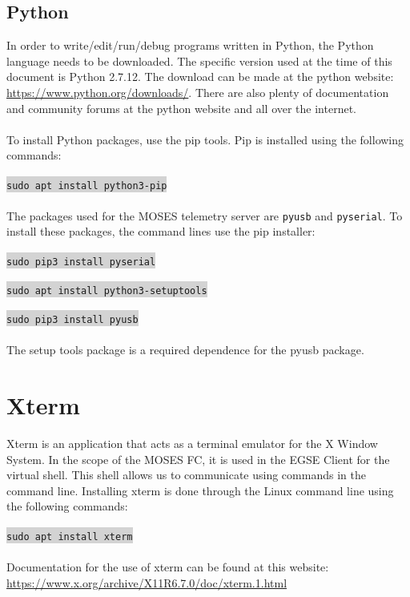 \documentclass[11pt,a4paper,titlepage]{article}
\begin{document}
	 \subsection{Python}
	 In order to write/edit/run/debug programs written in Python, the Python language needs to be downloaded. The specific version used at the time of this document is Python 2.7.12. The download can be made at the python website: \url{https://www.python.org/downloads/}. There are also plenty of documentation and community forums at the python website and all over the internet. \\
	 \\
	 To install Python packages, use the pip tools. Pip is installed using the following commands: \\
	 \\
	 \colorbox{lightgray}{\texttt{sudo apt install python3-pip}} \\
	 \\
	 
	 The packages used for the MOSES telemetry server are \texttt{pyusb} and \texttt{pyserial}. To install these packages, the command lines use the pip installer: \\
	 \\
	 \colorbox{lightgray}{\texttt{sudo pip3 install pyserial}} \\
	 \\
	 \colorbox{lightgray}{\texttt{sudo apt install python3-setuptools}} \\
	 \\
	 \colorbox{lightgray}{\texttt{sudo pip3 install pyusb}}\\
	 \\
	 The setup tools package is a required dependence for the pyusb package. 
	 
	 \section{Xterm}
	 Xterm is an application that acts as a terminal emulator for the X Window System. In the scope of the MOSES FC, it is used in the EGSE Client for the virtual shell. This shell allows us to communicate using commands in the command line. Installing xterm is done through the Linux command line using the following commands: \\
	 \\
	 \colorbox{lightgray}{\texttt{sudo apt install xterm}} \\
	 \\
	 Documentation for the use of xterm can be found at this website: \url{https://www.x.org/archive/X11R6.7.0/doc/xterm.1.html}
	 
	 
	
	 
	
\end{document}
